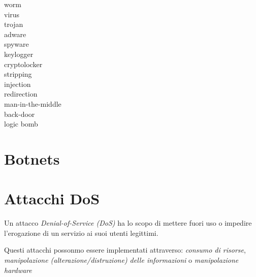 \begin{description}
  \item[worm]
  \item[virus] 
  \item[trojan]
  \item[adware]
  \item[spyware]
  \item[keylogger]
  \item[cryptolocker]
  \item[stripping]
  \item[injection]
  \item[redirection]
  \item[man-in-the-middle]
  \item[back-door]
  \item[logic bomb]
\end{description}

\section{Botnets}

\section{Attacchi DoS}
Un attacco \textit{Denial-of-Service (DoS)} ha lo scopo di mettere fuori uso o impedire l'erogazione di un servizio ai suoi utenti legittimi.

Questi attacchi possonmo essere implementati attraverso: \textit{consumo di risorse}, \textit{manipolazione (alterazione/distruzione) delle informazioni} o \textit{manipolazione hardware}
